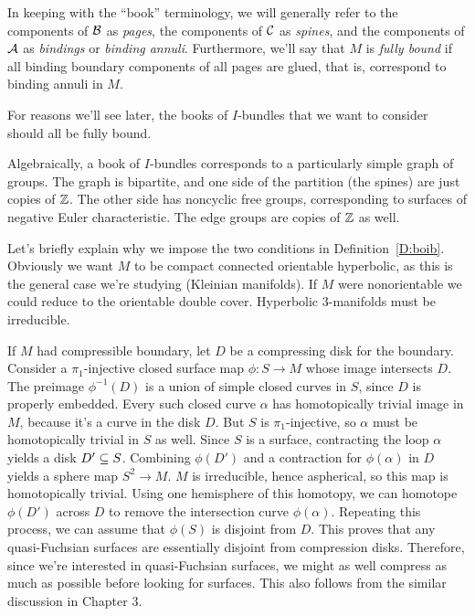 \begin{defn}

In keeping with the ``book'' terminology, we will generally refer to the
components of $\mathcal{B}$ as \emph{pages}, the components of $\mathcal{C}$ as \emph{spines},
and the components of $\mathcal{A}$ as \emph{bindings} or \emph{binding annuli}.
Furthermore, we'll say that $M$ is \emph{fully bound} if all binding boundary
components of all pages are glued, that is, correspond to binding annuli in
$M$.

\end{defn}

For reasons we'll see later, the books of $I$-bundles that we want to consider
should all be fully bound.

Algebraically, a book of $I$-bundles corresponds to a particularly simple graph
of groups. The graph is bipartite, and one side of the partition (the spines)
are just copies of $\mathbb{Z}$. The other side has noncyclic free groups,
corresponding to surfaces of negative Euler characteristic. The edge groups are
copies of $\mathbb{Z}$ as well.

Let's briefly explain why we impose the two conditions in
Definition~\ref{D:boib}.  Obviously we want $M$ to be compact connected
orientable hyperbolic, as this is the general case we're studying (Kleinian
manifolds). If $M$ were nonorientable we could reduce to the orientable double
cover. Hyperbolic $3$-manifolds must be irreducible.

If $M$ had compressible boundary, let $D$ be a compressing disk for the
boundary.  Consider a $\pi_1$-injective closed surface map $\phi \colon S \to
M$ whose image intersects $D$. The preimage $\phi^{-1}(D)$ is a union of simple
closed curves in $S$, since $D$ is properly embedded.  Every such closed curve
$\alpha$ has homotopically trivial image in $M$, because it's a curve in the
disk $D$.  But $S$ is $\pi_1$-injective, so $\alpha$ must be homotopically
trivial in $S$ as well.  Since $S$ is a surface, contracting the loop $\alpha$
yields a disk $D'\subseteq S$. Combining $\phi(D')$ and a contraction for
$\phi(\alpha)$ in $D$ yields a sphere map $S^2 \to M$. $M$ is irreducible,
hence aspherical, so this map is homotopically trivial. Using one hemisphere of
this homotopy, we can homotope $\phi(D')$ across $D$ to remove the intersection
curve $\phi(\alpha)$. Repeating this process, we can assume that $\phi(S)$ is
disjoint from $D$. This proves that any quasi-Fuchsian surfaces are essentially
disjoint from compression disks.  Therefore, since we're interested in
quasi-Fuchsian surfaces, we might as well compress as much as possible before
looking for surfaces. This also follows from the similar discussion in Chapter
3.

